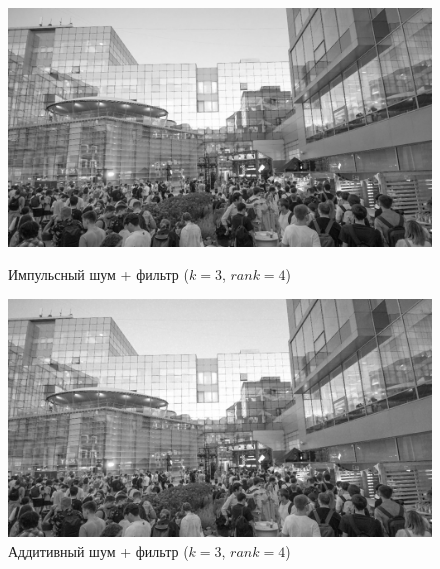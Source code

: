 \documentclass[a4paper]{article}
\begin{document}
\begin{figure}[H]
    \begin{minipage}{0.49\textwidth}
        \centering \includegraphics[width=\textwidth]{images/3_nonlinear_filters/impulse - rang (k=3, rank=4).jpg}
        \caption{Импульсный шум + фильтр ($k = 3$, $rank = 4$)}
    \end{minipage}\hfill
    \begin{minipage}{0.49\textwidth}
        \centering \includegraphics[width=\textwidth]{images/3_nonlinear_filters/additive - rang (k=3, rank=4).jpg}
        \caption{Аддитивный шум + фильтр ($k = 3$, $rank = 4$)}
    \end{minipage}
\end{figure}
\end{document}
